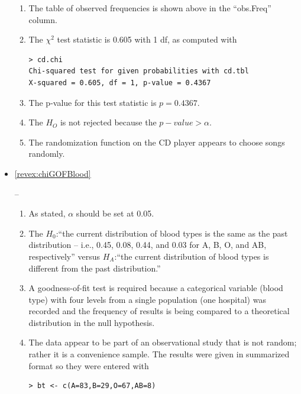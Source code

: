 \documentclass[10pt,openany]{book}\usepackage[]{graphicx}\usepackage[]{color}
\makeatletter
\newenvironment{kframe}{%
 \def\at@end@of@kframe{}%
 \ifinner\ifhmode%
  \def\at@end@of@kframe{\end{minipage}}%
  \begin{minipage}{\columnwidth}%
 \fi\fi%
 \def\FrameCommand##1{\hskip\@totalleftmargin \hskip-\fboxsep
 \colorbox{shadecolor}{##1}\hskip-\fboxsep
     \hskip-\linewidth \hskip-\@totalleftmargin \hskip\columnwidth}%
 \MakeFramed {\advance\hsize-\width
   \@totalleftmargin\z@ \linewidth\hsize
   \@setminipage}}%
 {\par\unskip\endMakeFramed%
 \at@end@of@kframe}
\newenvironment{knitrout}{}{} %
\makeatother
\begin{document}
\begin{itemize}
\begin{enumerate}
      \item The table of observed frequencies is shown above in the ``obs.Freq'' column.
      \item The $\chi^{2}$ test statistic is 0.605 with 1 df, as computed with
\begin{knitrout}
\color{fgcolor}\begin{kframe}
\begin{verbatim}
> cd.chi
Chi-squared test for given probabilities with cd.tbl 
X-squared = 0.605, df = 1, p-value = 0.4367
\end{verbatim}
\end{kframe}
\end{knitrout}
      \item The p-value for this test statistic is $p=0.4367$.
      \item The $H_{O}$ is not rejected because the $p-value>\alpha$.
      \item The randomization function on the CD player appears to choose songs randomly.
    \end{enumerate}
  \item \hypertarget{ans:chiGOFBlood}{\ref{revex:chiGOFBlood}} --
    \begin{enumerate}
      \item As stated, $\alpha$ should be set at 0.05.
      \item The $H_{0}$:``the current distribution of blood types is the same as the past distribution -- i.e., 0.45, 0.08, 0.44, and 0.03 for A, B, O, and AB, respectively'' versus $H_{A}$:``the current distribution of blood types is different from the past distribution.''
      \item A goodness-of-fit test is required because a categorical variable (blood type) with four levels from a single population (one hospital) was recorded and the frequency of results is being compared to a theoretical distribution in the null hypothesis.
      \item The data appear to be part of an observational study that is not random; rather it is a convenience sample.  The results were given in summarized format so they were entered with
\begin{knitrout}
\color{fgcolor}\begin{kframe}
\begin{verbatim}
> bt <- c(A=83,B=29,O=67,AB=8)
\end{verbatim}
\end{kframe}

\end{knitrout}
\end{enumerate}
\end{itemize}
\end{document}
